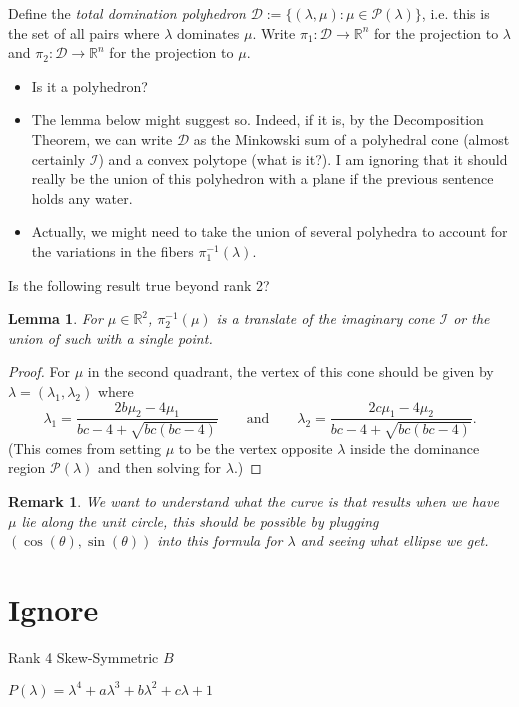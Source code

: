 \documentclass{amsart}
\newtheorem{lemma}[theorem]{Lemma}
\newtheorem{remark}[theorem]{Remark}
\numberwithin{theorem}{section}
\newcommand{\cD}{\mathcal{D}}
\newcommand{\cI}{\mathcal{I}}
\newcommand{\cP}{\mathcal{P}}
\newcommand{\RR}{\mathbb{R}}
\begin{document}
  Define the \emph{total domination polyhedron} $\cD:=\{(\lambda,\mu):\mu\in\cP(\lambda)\}$, i.e. this is the set of all pairs where $\lambda$ dominates $\mu$.
  Write $\pi_1:\cD\to\RR^n$ for the projection to $\lambda$ and $\pi_2:\cD\to\RR^n$ for the projection to $\mu$.
  \begin{itemize}
    \item Is it a polyhedron?
    \item The lemma below might suggest so.  
      Indeed, if it is, by the Decomposition Theorem, we can write $\cD$ as the Minkowski sum of a polyhedral cone (almost certainly $\cI$) and a convex polytope (what is it?).
      I am ignoring that it should really be the union of this polyhedron with a plane if the previous sentence holds any water.
    \item Actually, we might need to take the union of several polyhedra to account for the variations in the fibers $\pi_1^{-1}(\lambda)$.
  \end{itemize}

  Is the following result true beyond rank 2?
  \begin{lemma}
    For $\mu\in\RR^2$, $\pi_2^{-1}(\mu)$ is a translate of the imaginary cone $\cI$ or the union of such with a single point.
  \end{lemma}
  \begin{proof}
    For $\mu$ in the second quadrant, the vertex of this cone should be given by $\lambda=(\lambda_1,\lambda_2)$ where
    \[\lambda_1=\frac{2b\mu_2-4\mu_1}{bc-4+\sqrt{bc(bc-4)}} \qquad \text{and} \qquad \lambda_2=\frac{2c\mu_1-4\mu_2}{bc-4+\sqrt{bc(bc-4)}}.\]
    (This comes from setting $\mu$ to be the vertex opposite $\lambda$ inside the dominance region $\cP(\lambda)$ and then solving for $\lambda$.)
  \end{proof}
  \begin{remark}
    We want to understand what the curve is that results when we have $\mu$ lie along the unit circle, this should be possible by plugging $(\cos(\theta),\sin(\theta))$ into this formula for $\lambda$ and seeing what ellipse we get.
  \end{remark}


  \section{Ignore}
  Rank 4 Skew-Symmetric $B$

  $P(\lambda)=\lambda^4 + a\lambda^3 + b\lambda^2 + c\lambda + 1$
\end{document}
